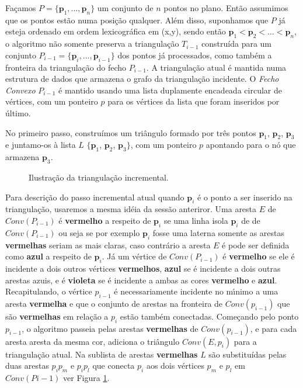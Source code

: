 \documentclass[12pt,a4paper]{book}
\begin{document}
Fa\c{c}amos $P = \{\mathbf{p}_{1},\ldots,\mathbf{p}_{n}\}$ um conjunto de $n$ pontos no plano. Ent\~{a}o
assumimos que os pontos est\~{a}o numa posi\c{c}\~{a}o qualquer. 
Al\'{e}m disso, suponhamos que $P$ j\'{a} esteja ordenado em ordem lexicogr\'{a}fica 
em (x,y), sendo ent\~{a}o $\mathbf{p}_{1}<\mathbf{p}_{2}<\ldots<\mathbf{p}_{n}$, o algoritmo n\~{a}o somente preserva a triangula\c{c}\~{a}o $T_{i-1}$ constru\'{i}da para um conjunto 
$P_{i-1} = \{\mathbf{p}_{i},...,\mathbf{p}_{i-1}\}$ dos pontos j\'{a} processados, como tamb\'{e}m a fronteira da triangula\c{c}\~{a}o do fecho $P_{i-1}$. A triangula\c{c}\~{a}o atual \'{e} mantida numa estrutura de dados que armazena o grafo da triangula\c{c}\~{a}o incidente. O \textit{Fecho Convexo} $P_{i-1}$ \'{e} mantido usando uma lista duplamente encadeada circular de v\'{e}rtices, com um ponteiro $p$ para os v\'{e}rtices da lista que foram inseridos por \'ultimo.

No primeiro passo, constru\'{i}mos um tri\^{a}ngulo formado por tr\^{e}s pontos
$\mathbf{p}_{1}$, $\mathbf{p}_{2}$, $\mathbf{p}_{3}$ e juntamo-os \`{a} lista $L$ $\{\mathbf{p}_{1}$, $\mathbf{p}_{2}$, $\mathbf{p}_{3}\}$, com um ponteiro $p$ apontando para o n\'{o} que armazena 
$\mathbf{p}_{3}$.

\begin{figure}[htbp]
  \begin{center}
    \leavevmode
    
    \caption{Ilustra\c{c}\~{a}o da triangula\c{c}\~{a}o incremental.}
    \label{fig15_chapter6}
  \end{center}
\end{figure}

Para descri\c{c}\~{a}o do passo incremental atual quando $\mathbf{p}_{i}$ \'{e} o ponto a ser inserido na triangula\c{c}\~{a}o, usaremos a mesma id\'{e}ia da sess\~{a}o anteriror. Uma aresta $E$ de $Conv(P_{i-1})$ \'{e} \textbf{vermelho} a respeito de $\mathbf{p}_{i}$ se uma linha isola  
$\mathbf{p}_{i}$ de de $Conv(P_{i-1})$ ou seja se por exemplo $\mathbf{p}_{i}$ fosse uma laterna somente as arestas \textbf{vermelhas} seriam as mais claras, caso contr\'{a}rio a aresta $E$ \'{e} pode ser definida como  \textbf{azul} a respeito de $\mathbf{p}_{i}$. J\'{a} um v\'{e}rtice de $Conv(P_{i-1})$ \'{e} \textbf{vermelho} se ele \'{e} incidente a dois outros v\'{e}rtices \textbf{vermelhos}, \textbf{azul} se \'{e} incidente a dois outras arestas azuis, e \'{e} \textbf{violeta} se \'{e} incidente a ambas as cores \textbf{vermelho} e \textbf{azul}. Recapitulando, o v\'{e}rtice $p_{i-1}$ \'{e} necessariamente incidente no m\'{\i}nimo a uma aresta \textbf{vermelha} e que o conjunto de arestas na fronteira de $Conv(p_{i-1})$ que s\~{a}o \textbf{vermelhas} em rela\c{c}\~{a}o a $p_{i}$ est\~{a}o
tamb\'{e}m conectadas. Come\c{c}ando pelo ponto $p_{i-1}$, o algoritmo
passeia pelas arestas \textbf{vermelhas} de $Conv(p_{i-1})$, e para cada aresta aresta da mesma cor,
adiciona o tri\^{a}ngulo $Conv(E,p_{i})$ para a triangula\c{c}\~{a}o atual.
Na sublista de arestas \textbf{vermelhas} $L$ s\~{a}o substitu\'{i}das pelas duas
arestas $p_{i}p_{m}$ e $p_{i}p_{l}$ que conecta $p_{i}$ aos dois v\'{e}rtices $p_{m}$ e 
$p_{l}$ em $Conv(Pi-1)$ ver Figura \ref{fig15_chapter6}.
\end{document}
